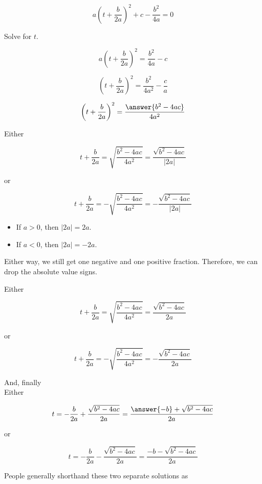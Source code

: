 \documentclass{ximera}
\begin{document}
\[ a\left(t + \frac{b}{2 a}\right)^2 + c - \frac{b^2}{4 a}  = 0\]

Solve for $t$.


\[ a \left(t + \frac{b}{2 a} \right)^2  = \frac{b^2}{4 a} - c\]

\[ \left(t + \frac{b}{2 a} \right)^2  = \frac{b^2}{4 a^2} - \frac{c}{a}\]

\[ \left(t + \frac{b}{2 a} \right)^2  = \frac{\answer{b^2 - 4 a c}}{4 a^2} \]



Either 


\[ t + \frac{b}{2 a}  = \sqrt{\frac{b^2 - 4 a c}{4 a^2}}  = \frac{\sqrt{b^2 - 4 a c}}{| 2a |}   \]

or


\[ t + \frac{b}{2 a}  = -\sqrt{\frac{b^2 - 4 a c}{4 a^2}} = -\frac{\sqrt{b^2 - 4 a c}}{| 2a |}    \]



\begin{itemize}
\item If $a > 0$, then $| 2a | = 2a$.
\item If $a < 0$, then $| 2a | = -2a$.
\end{itemize}

Either way, we still get one negative and one positive fraction.  Therefore, we can drop the absolute value signs.  




Either 


\[ t + \frac{b}{2 a}  = \sqrt{\frac{b^2 - 4 a c}{4 a^2}}  = \frac{\sqrt{b^2 - 4 a c}}{2a}   \]

or


\[ t + \frac{b}{2 a}  = -\sqrt{\frac{b^2 - 4 a c}{4 a^2}} = -\frac{\sqrt{b^2 - 4 a c}}{2a}    \]










And, finally \\



Either 


\[ t   = - \frac{b}{2 a} + \frac{\sqrt{b^2 - 4 a c}}{2a}  = \frac{\answer{-b} + \sqrt{b^2 - 4 a c}}{2a}      \]

or


\[ t  = - \frac{b}{2 a}  -\frac{\sqrt{b^2 - 4 a c}}{2a} =    \frac{-b - \sqrt{b^2 - 4 a c}}{2a}      \]




People generally shorthand these two separate solutions as
\end{document}
